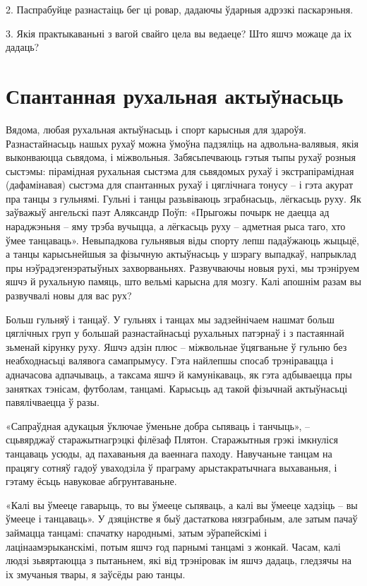 2. Паспрабуйце разнастаіць бег ці ровар, дадаючы ўдарныя адрэзкі паскарэньня.

3. Якія практыкаваньні з вагой свайго цела вы ведаеце? Што яшчэ можаце да іх дадаць?


\section{Спантанная рухальная актыўнасьць}

Вядома, любая рухальная актыўнасьць і спорт карысныя для здароўя. Разнастайнасьць нашых рухаў можна ўмоўна падзяліць на адвольна-валявыя, якія выконваюцца сьвядома, і міжвольныя. Забясьпечваюць гэтыя тыпы рухаў розныя сыстэмы: пірамідная рухальная сыстэма для сьвядомых рухаў і экстрапірамідная (дафамінавая) сыстэма для спантанных рухаў і цяглічнага тонусу – і гэта акурат пра танцы з гульнямі. Гульні і танцы разьвіваюць зграбнасьць, лёгкасьць руху. Як заўважыў ангельскі паэт Аляксандр Поўп: «Прыгожы почырк не даецца ад нараджэньня – яму трэба вучыцца, а лёгкасьць руху – адметная рыса таго, хто ўмее танцаваць». Невыпадкова гульнявыя віды спорту лепш падаўжаюць жыцьцё, а танцы карысьнейшыя за фізычную актыўнасьць у шэрагу выпадкаў, напрыклад пры нэўрадэгенэратыўных захворваньнях. Развучваючы новыя рухі, мы трэніруем яшчэ й рухальную памяць, што вельмі карысна для мозгу. Калі апошнім разам вы развучвалі новы для вас рух?

Больш гульняў і танцаў. У гульнях і танцах мы задзейнічаем нашмат больш цяглічных груп у большай разнастайнасьці рухальных патэрнаў і з пастаяннай зьменай кірунку руху. Яшчэ адзін плюс – міжвольнае ўцягваньне ў гульню без неабходнасьці валявога самапрымусу. Гэта найлепшы спосаб трэніравацца і адначасова адпачываць, а таксама яшчэ й камунікаваць, як гэта адбываецца пры занятках тэнісам, футболам, танцамі. Карысьць ад такой фізычнай актыўнасьці павялічваецца ў разы.

«Сапраўдная адукацыя ўключае ўменьне добра сьпяваць і танчыць», – сцьвярджаў старажытнагрэцкі філёзаф Плятон. Старажытныя грэкі імкнуліся танцаваць усюды, ад пахаваньня да ваеннага паходу. Навучаньне танцам на працягу сотняў гадоў уваходзіла ў праграму арыстакратычнага выхаваньня, і гэтаму ёсьць навуковае абгрунтаваньне.

«Калі вы ўмееце гаварыць, то вы ўмееце сьпяваць, а калі вы ўмееце хадзіць – вы ўмееце і танцаваць». У дзяцінстве я быў дастаткова нязграбным, але затым пачаў займацца танцамі: спачатку народнымі, затым эўрапейскімі і лацінаамэрыканскімі, потым яшчэ год парнымі танцамі з жонкай. Часам, калі людзі зьвяртаюцца з пытаньнем, які від трэніровак ім яшчэ дадаць, гледзячы на іх змучаныя твары, я заўсёды раю танцы.

